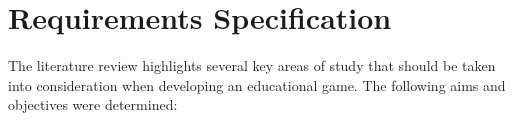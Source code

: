 \documentclass[a4paper,11.5pt]{report}
\numberwithin{figure}{section}
\numberwithin{table}{section}
\numberwithin{equation}{section}
\numberwithin{equation}{section}
\newcommand\blankpage{%
    \null
    \thispagestyle{empty}%
    \addtocounter{page}{-1}%
    \newpage}
\begin{document}


\afterpage{\blankpage}





\chapter{Requirements Specification}



The literature review highlights several key areas of study that should be taken into consideration when developing an educational game. The following aims and objectives were determined:
\end{document}
